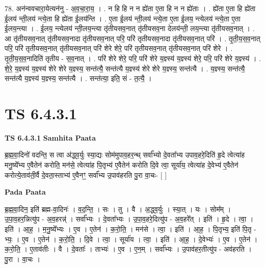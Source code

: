 \documentclass[17pt]{extarticle}
\begin{document}
78. अन॑न्ववचारा॒येत्यन॑नु - अ॒व॒चा॒रा॒य॒ । . न हि हि न न ह्ये॑ता ए॒ता हि न न ह्ये॑ताः । . ह्ये॑ता ए॒ता हि ह्ये॑ता ई॒लय॑ न्ती॒लय॑ न्त्ये॒ता हि ह्ये॑ता ई॒लय॑न्ति । . ए॒ता ई॒लय॑ न्ती॒लय॑ न्त्ये॒ता ए॒ता ई॒लय॒ न्त्येलय॑ न्त्ये॒ता ए॒ता ई॒लय॒न्त्या । . ई॒लय॒ न्त्येलय॑ न्ती॒लय॒न्त्या तृ॑तीयसव॒नात् तृ॑तीयसव॒ना देलय॑न्ती॒ लय॒न्त्या तृ॑तीयसव॒नात् । . आ तृ॑तीयसव॒नात् तृ॑तीयसव॒नादा तृ॑तीयसव॒नात् परि॒ परि॑ तृतीयसव॒नादा तृ॑तीयसव॒नात् परि॑ । . तृ॒ती॒य॒स॒व॒नात् परि॒ परि॑ तृतीयसव॒नात् तृ॑तीयसव॒नात् परि॑ शेरे शेरे॒ परि॑ तृतीयसव॒नात् तृ॑तीयसव॒नात् परि॑ शेरे । . तृ॒ती॒य॒स॒व॒नादिति॑ तृतीय - स॒व॒नात् । . परि॑ शेरे शेरे॒ परि॒ परि॑ शेरे य॒ज्ञ्स्य॑ य॒ज्ञ्स्य॑ शेरे॒ परि॒ परि॑ शेरे य॒ज्ञ्स्य॑ । . शे॒रे॒ य॒ज्ञ्स्य॑ य॒ज्ञ्स्य॑ शेरे शेरे य॒ज्ञ्स्य॒ सन्त॑त्यै॒ सन्त॑त्यै य॒ज्ञ्स्य॑ शेरे शेरे य॒ज्ञ्स्य॒ सन्त॑त्यै । . य॒ज्ञ्स्य॒ सन्त॑त्यै॒ सन्त॑त्यै य॒ज्ञ्स्य॑ य॒ज्ञ्स्य॒ सन्त॑त्यै । . सन्त॑त्या॒ इति॒ सं - त॒त्यै॒ । \newline
\pagebreak
{}

\section{ TS 6.4.3.1 }

\textbf{TS 6.4.3.1 } \newline
\textbf{Samhita Paata} \newline

ब्र॒ह्म॒वा॒दिनो॑ वदन्ति॒ स त्वा अ॑द्ध्व॒र्युः स्या॒द्यः सोम॑मुपाव॒हर॒न्थ् सर्वा᳚भ्यो दे॒वता᳚भ्य उपाव॒हरे॒दिति॑ हृ॒दे त्वेत्या॑ह मनु॒ष्ये᳚भ्य ए॒वैतेन॑ करोति॒ मन॑से॒ त्वेत्या॑ह पि॒तृभ्य॑ ए॒वैतेन॑ करोति दि॒वे त्वा॒ सूर्या॑य॒ त्वेत्या॑ह दे॒वेभ्य॑ ए॒वैतेन॑ करोत्ये॒ताव॑ती॒र्वै दे॒वता॒स्ताभ्य॑ ए॒वैनꣳ॒॒ सर्वा᳚भ्य उ॒पाव॑हरति पु॒रा वा॒चः- [  ] \newline

\textbf{Pada Paata} \newline

ब्र॒ह्म॒वा॒दिन॒ इति॑ ब्रह्म-वा॒दिनः॑ । व॒द॒न्ति॒ । सः । तु । वै । अ॒द्ध्व॒र्युः । स्या॒त् । यः । सोम᳚म् । उ॒पा॒व॒हर॒न्नित्यु॑प - अ॒व॒हरन्न्॑ । सर्वा᳚भ्यः । दे॒वता᳚भ्यः । उ॒पा॒व॒हरे॒दित्यु॑प - अ॒व॒हरे᳚त् । इति॑ । हृ॒दे । त्वा॒ । इति॑ । आ॒ह॒ । म॒नु॒ष्ये᳚भ्यः । ए॒व । ए॒तेन॑ । क॒रो॒ति॒ । मन॑से । त्वा॒ । इति॑ । आ॒ह॒ । पि॒तृभ्य॒ इति॑ पि॒तृ - भ्यः॒ । ए॒व । ए॒तेन॑ । क॒रो॒ति॒ । दि॒वे । त्वा॒ । सूर्या॑य । त्वा॒ । इति॑ । आ॒ह॒ । दे॒वेभ्यः॑ । ए॒व । ए॒तेन॑ । क॒रो॒ति॒ । ए॒ताव॑तीः । वै । दे॒वताः᳚ । ताभ्यः॑ । ए॒व । ए॒न॒म् । सर्वा᳚भ्यः । उ॒पाव॑हर॒तीत्यु॑प - अव॑हरति । पु॒रा । वा॒चः ।  \newline
\end{document}
